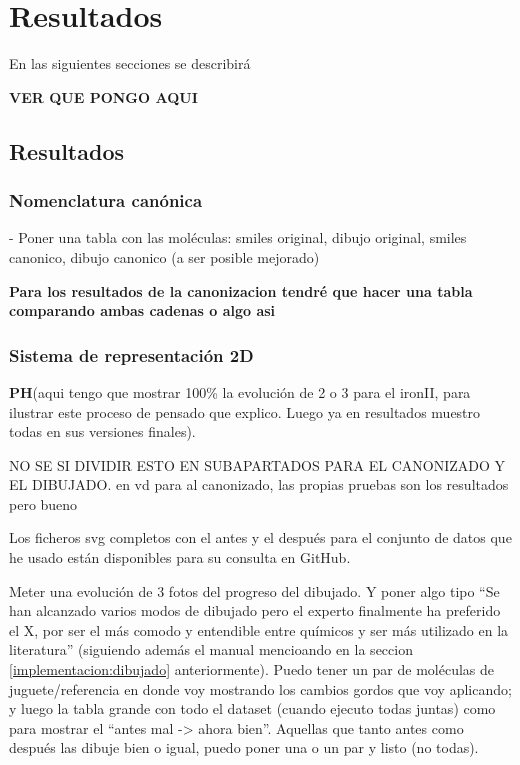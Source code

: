 
\chapter{Resultados}

En las siguientes secciones se describirá 

\textbf{VER QUE PONGO AQUI}

\section{Resultados}

\subsection{Nomenclatura canónica}
- Poner una tabla con las moléculas: smiles original, dibujo original, smiles canonico, dibujo canonico (a ser posible mejorado)

\textbf{Para los resultados de la canonizacion tendré que hacer una tabla comparando ambas cadenas o algo asi}

\subsection{Sistema de representación 2D}

\textbf{PH}(aqui tengo que mostrar 100\% la evolución de 2 o 3 para el ironII, para ilustrar este proceso de pensado que explico. Luego ya en resultados muestro todas en sus versiones finales). 


NO SE SI DIVIDIR ESTO EN SUBAPARTADOS PARA EL CANONIZADO Y EL DIBUJADO. en vd para al canonizado, las propias pruebas son los resultados pero bueno


Los ficheros svg completos con el antes y el después para el conjunto de datos que he usado están disponibles para su consulta en GitHub.

Meter una evolución de 3 fotos del progreso del dibujado. Y poner algo tipo “Se han alcanzado varios modos de dibujado pero el experto finalmente ha preferido el X, por ser el más comodo y entendible entre químicos y ser más utilizado en la literatura” (siguiendo además el manual mencioando en la seccion \ref{implementacion:dibujado} anteriormente). Puedo tener un par de moléculas de juguete/referencia en donde voy mostrando los cambios gordos que voy aplicando; y luego la tabla grande con todo el dataset (cuando ejecuto todas juntas) como para mostrar el “antes mal -> ahora bien”. Aquellas que tanto antes como después las dibuje bien o igual, puedo poner una o un par y listo (no todas).

